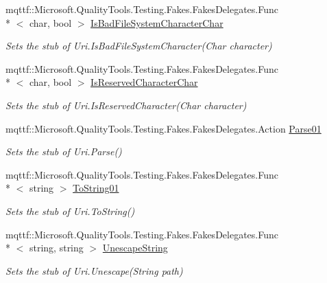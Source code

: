 \begin{DoxyCompactItemize}
mqttf\-::\-Microsoft.\-Quality\-Tools.\-Testing.\-Fakes.\-Fakes\-Delegates.\-Func\\*
$<$ char, bool $>$ \hyperlink{class_system_1_1_fakes_1_1_stub_uri_aced03b2ba12cbe85f2be16be1159182d}{Is\-Bad\-File\-System\-Character\-Char}
\begin{DoxyCompactList}\small\item\em Sets the stub of Uri.\-Is\-Bad\-File\-System\-Character(\-Char character)\end{DoxyCompactList}\item 
mqttf\-::\-Microsoft.\-Quality\-Tools.\-Testing.\-Fakes.\-Fakes\-Delegates.\-Func\\*
$<$ char, bool $>$ \hyperlink{class_system_1_1_fakes_1_1_stub_uri_a43379fd66444ef7b257c096b12c2989b}{Is\-Reserved\-Character\-Char}
\begin{DoxyCompactList}\small\item\em Sets the stub of Uri.\-Is\-Reserved\-Character(\-Char character)\end{DoxyCompactList}\item 
mqttf\-::\-Microsoft.\-Quality\-Tools.\-Testing.\-Fakes.\-Fakes\-Delegates.\-Action \hyperlink{class_system_1_1_fakes_1_1_stub_uri_aa2b48d792bbd2facc7b8325911ecd9e9}{Parse01}
\begin{DoxyCompactList}\small\item\em Sets the stub of Uri.\-Parse()\end{DoxyCompactList}\item 
mqttf\-::\-Microsoft.\-Quality\-Tools.\-Testing.\-Fakes.\-Fakes\-Delegates.\-Func\\*
$<$ string $>$ \hyperlink{class_system_1_1_fakes_1_1_stub_uri_a4bb92fa7fc0cf302babe2dc653a92b85}{To\-String01}
\begin{DoxyCompactList}\small\item\em Sets the stub of Uri.\-To\-String()\end{DoxyCompactList}\item 
mqttf\-::\-Microsoft.\-Quality\-Tools.\-Testing.\-Fakes.\-Fakes\-Delegates.\-Func\\*
$<$ string, string $>$ \hyperlink{class_system_1_1_fakes_1_1_stub_uri_a42185b9a50f0ba802df5ea350c3bee41}{Unescape\-String}
\begin{DoxyCompactList}\small\item\em Sets the stub of Uri.\-Unescape(\-String path)\end{DoxyCompactList}\end{DoxyCompactItemize}
